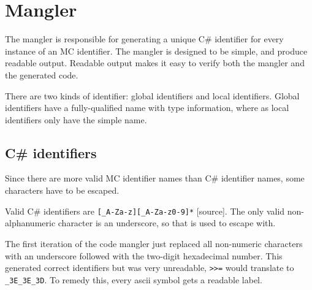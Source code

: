 \section{Mangler}
The mangler is responsible for generating a unique C\# identifier for every instance of an MC identifier.
The mangler is designed to be simple, and produce readable output.
Readable output makes it easy to verify both the mangler and the generated code.

There are two kinds of identifier: global identifiers and local identifiers.
Global identifiers have a fully-qualified name with type information, where as local identifiers only have the simple name.

\subsection{C\# identifiers}
Since there are more valid MC identifier names than C\# identifier names, some characters have to be escaped.

Valid C\# identifiers are \verb|[_A-Za-z][_A-Za-z0-9]*| [source].
The only valid non-alphanumeric character is an underscore, so that is used to escape with.

The first iteration of the code mangler just replaced all non-numeric characters with an underscore followed with the two-digit hexadecimal number.
This generated correct identifiers but was very unreadable, \verb|>>=| would translate to \verb|_3E_3E_3D|.
To remedy this, every ascii symbol gets a readable label.



